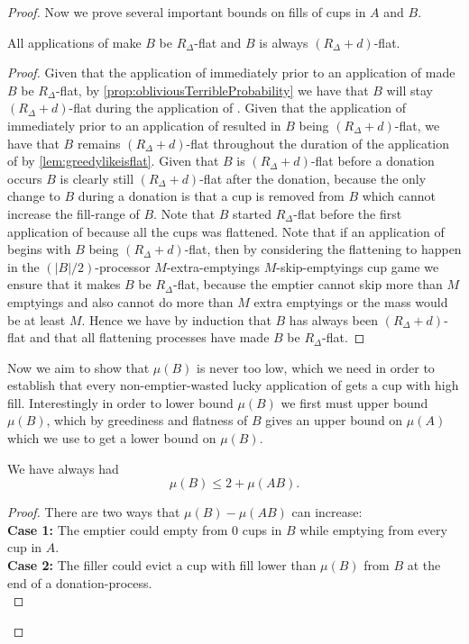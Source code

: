 \begin{proof}
Now we prove several important bounds on fills of cups in $A$ and $B$.
\begin{clm}
  \label{clm:allflatteningsworkbyM}
  All applications of \flatalg make $B$ be $R_\Delta$-flat and
  $B$ is always $(R_\Delta + d)$-flat.
\end{clm}
\begin{proof}
  Given that the application of \flatalg immediately prior to an application
  of \randalg made $B$ be $R_\Delta$-flat, by
  \cref{prop:obliviousTerribleProbability} we have that $B$ will
  stay $(R_\Delta + d)$-flat during the application of \randalg. 
  Given that the application of \randalg immediately prior to an
  application of \flatalg resulted in $B$ being $(R_\Delta
  + d)$-flat, we have that $B$ remains $(R_\Delta + d)$-flat
  throughout the duration of the application of \flatalg by
  \cref{lem:greedylikeisflat}. Given that $B$ is $(R_\Delta +
  d)$-flat before a donation occurs $B$ is clearly still $(R_\Delta +
  d)$-flat after the donation, because the only change to $B$ during
  a donation is that a cup is removed from $B$ which cannot increase
  the fill-range of $B$.
  Note that $B$ started $R_\Delta$-flat before the first
  application of \flatalg because all the cups was flattened.
  Note that if an application of \flatalg begins with $B$ being
  $(R_\Delta + d)$-flat, then by considering the flattening to
  happen in the $(|B|/2)$-processor $M$-extra-emptyings
  $M$-skip-emptyings cup game we ensure that it makes $B$ be
  $R_\Delta$-flat, because the emptier cannot skip more than $M$
  emptyings and also cannot do more than $M$ extra emptyings or
  the mass would be at least $M$.
  Hence we have by induction that $B$ has always been $(R_\Delta
  + d)$-flat and that all flattening processes have made $B$ be
  $R_\Delta$-flat. 
\end{proof}

Now we aim to show that $\mu(B)$ is never too low, which we need
in order to establish that every non-emptier-wasted lucky
application of \randalg gets a cup with high fill. Interestingly
in order to lower bound $\mu(B)$ we first must upper bound
$\mu(B)$, which by greediness and flatness of $B$ gives an upper
bound on $\mu(A)$ which we use to get a lower bound on $\mu(B)$.

\begin{clm}
  \label{clm:muBdoesntgettoobig}
  We have always had
  $$\mu(B) \le 2 + \mu(A B).$$
\end{clm}
\begin{proof}
  There are two ways that $\mu(B)-\mu(A B)$ can increase: \\
  \textbf{Case 1:}
  The emptier could empty from $0$ cups in $B$ while emptying
  from every cup in $A$. \\
  \textbf{Case 2:}
  The filler could evict a cup with fill lower than $\mu(B)$ from
  $B$ at the end of a donation-process. \\


\end{proof}
\end{proof}
